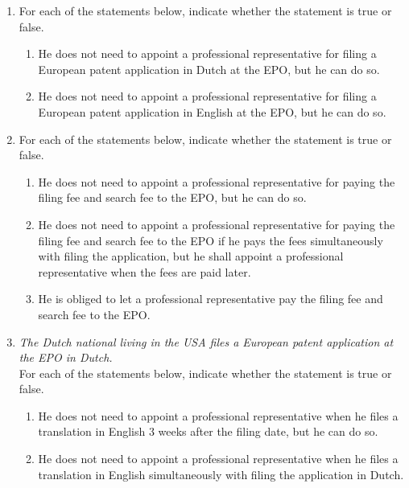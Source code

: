 \documentclass{report}
\begin{document}
\begin{enumerate}[label=\textbf{Question \arabic*}]
\begin{enumerate}[label=\textbf{Question \arabic*}]
    \begin{enumerate}[label=(\alph*)]
        \item For each of the statements below, indicate whether the statement is true or false.
        \begin{enumerate}[label={(\alph{enumi}.\arabic*)}]
            \item He does not need to appoint a professional representative for filing a European patent application in Dutch at the EPO, but he can do so.
            \item He does not need to appoint a professional representative for filing a European patent application in English at the EPO, but he can do so.
        \end{enumerate}
        
        \item For each of the statements below, indicate whether the statement is true or false.
        \begin{enumerate}[label={(\alph{enumi}.\arabic*)}]
            \item He does not need to appoint a professional representative for paying the filing fee and search fee to the EPO, but he can do so.
            \item He does not need to appoint a professional representative for paying the filing fee and search fee to the EPO if he pays the fees simultaneously with filing the application, but he shall appoint a professional representative when the fees are paid later.
            \item He is obliged to let a professional representative pay the filing fee and search fee to the EPO.
        \end{enumerate}
        
        \item \textit{The Dutch national living in the USA files a European patent application at the EPO in Dutch.} \\
        For each of the statements below, indicate whether the statement is true or false.
        \begin{enumerate}[label={(\alph{enumi}.\arabic*)}]
            \item He does not need to appoint a professional representative when he files a translation in English 3 weeks after the filing date, but he can do so.
            \item He does not need to appoint a professional representative when he files a translation in English simultaneously with filing the application in Dutch.
        \end{enumerate}
        

\end{enumerate}
\end{enumerate}
\end{enumerate}
\end{document}

